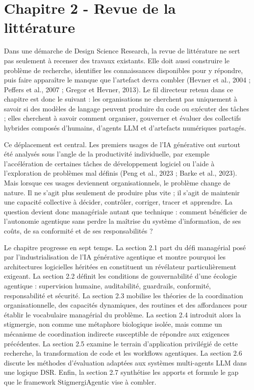 \chapter{Chapitre 2 - Revue de la littérature}\label{chapitre-2---revue-de-la-littuxe9rature}

Dans une démarche de Design Science Research, la revue de littérature ne sert pas seulement à recenser des travaux existants. Elle doit aussi construire le problème de recherche, identifier les connaissances disponibles pour y répondre, puis faire apparaître le manque que l'artefact devra combler (Hevner et al., 2004 ; Peffers et al., 2007 ; Gregor et Hevner, 2013). Le fil directeur retenu dans ce chapitre est donc le suivant : les organisations ne cherchent pas uniquement à savoir si des modèles de langage peuvent produire du code ou exécuter des tâches ; elles cherchent à savoir comment organiser, gouverner et évaluer des collectifs hybrides composés d'humains, d'agents LLM et d'artefacts numériques partagés.

Ce déplacement est central. Les premiers usages de l'IA générative ont surtout été analysés sous l'angle de la productivité individuelle, par exemple l'accélération de certaines tâches de développement logiciel ou l'aide à l'exploration de problèmes mal définis (Peng et al., 2023 ; Barke et al., 2023). Mais lorsque ces usages deviennent organisationnels, le problème change de nature. Il ne s'agit plus seulement de produire plus vite ; il s'agit de maintenir une capacité collective à décider, contrôler, corriger, tracer et apprendre. La question devient donc managériale autant que technique : comment bénéficier de l'autonomie agentique sans perdre la maîtrise du système d'information, de ses coûts, de sa conformité et de ses responsabilités ?

Le chapitre progresse en sept temps. La section 2.1 part du défi managérial posé par l'industrialisation de l'IA générative agentique et montre pourquoi les architectures logicielles héritées en constituent un révélateur particulièrement exigeant. La section 2.2 définit les conditions de gouvernabilité d'une écologie agentique : supervision humaine, auditabilité, guardrails, conformité, responsabilité et sécurité. La section 2.3 mobilise les théories de la coordination organisationnelle, des capacités dynamiques, des routines et des affordances pour établir le vocabulaire managérial du problème. La section 2.4 introduit alors la stigmergie, non comme une métaphore biologique isolée, mais comme un mécanisme de coordination indirecte susceptible de répondre aux exigences précédentes. La section 2.5 examine le terrain d'application privilégié de cette recherche, la transformation de code et les workflows agentiques. La section 2.6 discute les méthodes d'évaluation adaptées aux systèmes multi-agents LLM dans une logique DSR. Enfin, la section 2.7 synthétise les apports et formule le gap que le framework StigmergiAgentic vise à combler.

